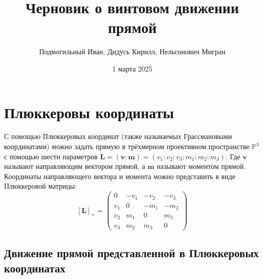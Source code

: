

\author{Подмогильный Иван, Дидусь Кирилл, Нельсонович Мигран}
\date{1 марта 2025}
\title{Черновик о винтовом движении прямой}


  
  \maketitle


  


  \section{Плюккеровы координаты}

  С помощью Плюккеровых координат (также называемых Грассмановыми координатами) \autocite[Гл. 7]{hodgeMethodsAlgebraicGeometry1994}
  можно задать прямую в трёхмерном проективном пространстве $\mathbb{P}^3$ с помощью шести параметров $\mathbf{L}=(\mathbf{v}:\mathbf{m})=(v_1:v_2:v_3:m_1:m_2:m_3)$.
  Где $\mathbf{v}$ называют направляющим вектором прямой, а $\mathbf{m}$ называют моментом прямой. Координаты направляющего вектора и момента можно представить в виде
  Плюккеровой матрицы: 
  \begin{equation*}
    \mathbf{[L]}_\times = 
    \begin{pmatrix}
      0 & -v_1 & -v_2 & -v_3 \\
      v_1 & 0 & -m_1 & -m_2 \\
      v_2 & m_1 & 0 & m_3 \\
      v_3 & m_2 & m_3 & 0
\end{pmatrix}
  \end{equation*}
  
  \subsection{Движение прямой представленной в Плюккеровых координатах}


